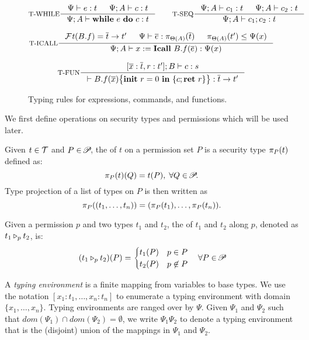 {{{\begin{figure*}
\[
\inference[T-WHILE]
{\Psi \vdash e : t & \Psi ; A\vdash c : t  }
{\Psi; A \vdash \lcWHILE{e}{c} : t }
\qquad
\inference[T-SEQ]
{\Psi; A\vdash c_1 : t & \Psi ; A\vdash c_2 : t }
{\Psi ; A\vdash \lcSEQ{c_1}{c_2} : t}
\]

\[
\inference[T-ICALL]
{\FT(B.f) = \overline{t} \rightarrow t' &
\Psi \vdash \overline{e} : \app{\overline{t}}{\Theta(A)} &
\app{t'}{\Theta(A)} \leq \Psi(x)}
{\Psi; A \vdash \lcCALL{x}{B.f}{\overline{e}} :
 \Psi(x)  }
\]

\[
\inference[T-FUN]
{[\overline{x}:\overline{t}, r : t'] ; B\vdash c : s}
{ \vdash \lpFUN{B.f}{\overline{x}}{c} :
  \overline{t} \rightarrow t'}
\]
\caption{Typing rules for expressions, commands, and functions.}
\label{fig:typing-rules}
\end{figure*}


 
We first define operations on security types and permissions which will
be used later.

\begin{definition}\label{def:projection}
Given $t\in\Tcal$ and $P\in\PPS$, the  of $t$ on a permission set $P$ is a security type  $\app{t}{P}$ defined as: \begin{equation*}
\app{t}{P}(Q) = t(P),\; \forall Q\in \PPS.
\end{equation*}
Type projection of a list of types
on $P$ is then written as
{\myeqsize\[
\app{(t_1,\dots,t_n)}{P} = (\app{t_1}{P}, \dots, \app{t_n}{P}).
\]}
\end{definition}

\begin{definition}\label{def:merge}
Given a permission $p$ and two types $t_1$ and $t_2$, the {} of
$t_1$ and $t_2$ along $p$, denoted as $\omerge {p} {t_1} {t_2}$, is:
{\myeqsize\begin{equation*}
(\omerge p {t_1} {t_2}) (P) =
\begin{cases}
t_1(P) & p\in P \\
t_2(P) & p\not\in P\\
\end{cases}
\quad\forall P\in{\PPS}
\end{equation*}}
\end{definition}
A {\em typing environment} is a finite mapping from variables to base types.
We use the notation  $[x_1 : t_1, \dots, x_n : t_n]$
to enumerate a typing environment with domain $\{x_1,\dots,x_n\}.$
Typing environments are ranged over by $\Psi.$
Given $\Psi_1$ and $\Psi_2$ such that $dom(\Psi_1) \cap dom(\Psi_2) = \emptyset$,
we write $\Psi_1\Psi_2$ to denote a typing environment that is the (disjoint) union of the mappings
in $\Psi_1$ and $\Psi_2$.

}}}
